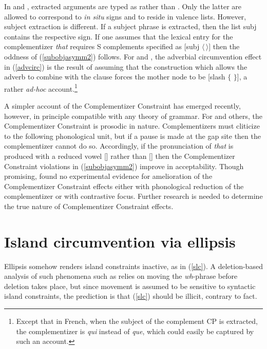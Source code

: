 \documentclass[output=paper
                ,modfonts
                ,nonflat
	        ,collection
	        ,collectionchapter
	        ,collectiontoclongg
 	        ,biblatex
                ,babelshorthands
                ,newtxmath
                ,draftmode
                ,colorlinks, citecolor=brown
]{./langsci/langscibook}
\begin{document}
\noindent
In \citet{bouma} and \citet{ginzsag}, extracted arguments are typed as  rather than . Only the latter are allowed to correspond to \emph{in situ} signs and to reside in valence lists. However, subject extraction is different. If a subject phrase is extracted, then the list {\sc subj} contains the respective  sign. If one assumes that the lexical entry for the complementizer \emph{that} requires  S complements specified as $[${\sc subj} $\langle \, \rangle]$ then the oddness of  (\ref{subobjasymm2}) follows. For  \citet{bouma} and \citet{ginzsag}, the adverbial circumvention effect in (\ref{advcirc}) is the result of assuming that the construction which allows the adverb to combine with the clause forces the mother node to be [{\sc slash} $\lbrace$ $\rbrace$], a rather \emph{ad-hoc} account.\footnote{Except that in French, when the subject of the complement CP is extracted, the complementizer is {\it qui} instead of {\it que}, which could easily be captured by such an account.}

A simpler account of the  Complementizer Constraint has emerged recently, however, in principle compatible with any theory of grammar. For \citet{Kandy06,Kandy09} and others,  the Complementizer Constraint is prosodic in nature.  Complementizers must cliticize to the following phonological unit, but if a pause is made at the gap site then the complementizer cannot do so.  Accordingly, if the pronunciation of \emph{that} is
produced with a reduced vowel [] rather than [] then the
Complementizer Constraint violations in (\ref{subobjasymm2}) improve in acceptability. Though promising,
\citet{Richart} found no experimental evidence for amelioration of the Complementizer Constraint effects
either with phonological reduction of the complementizer or with contrastive focus. Further research is needed
to determine the true nature of  Complementizer Constraint effects.



\section{Island circumvention via ellipsis}

Ellipsis somehow renders island  constraints inactive, as in (\ref{slc}). A deletion-based analysis of such phenomena such as  \citet{merchantbook}  relies on moving the \emph{wh}-phrase before deletion takes place, but since  movement is assumed to be sensitive to syntactic island constraints, the  prediction is that (\ref{slc}) should be illicit, contrary to fact. 
\end{document}
